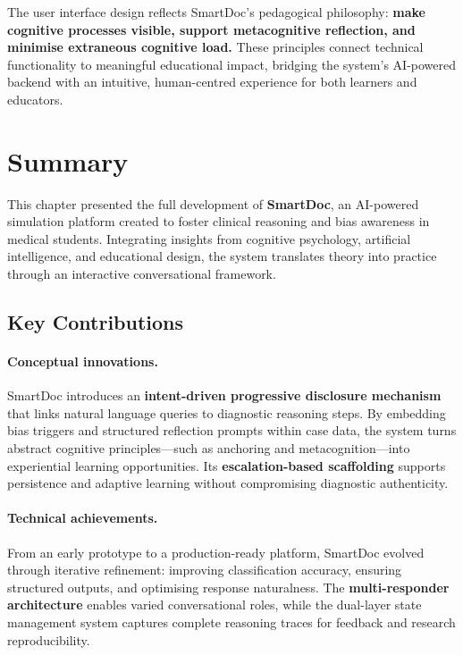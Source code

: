 \medskip
The user interface design reflects SmartDoc's pedagogical philosophy:
\textbf{make cognitive processes visible, support metacognitive reflection, and
minimise extraneous cognitive load.}
These principles connect technical functionality to meaningful educational impact,
bridging the system’s AI-powered backend with an intuitive, human-centred
experience for both learners and educators.

\newpage
\section{Summary}
\label{sec:summary}

This chapter presented the full development of \textbf{SmartDoc}, an AI-powered
simulation platform created to foster clinical reasoning and bias awareness in
medical students.
Integrating insights from cognitive psychology, artificial intelligence, and
educational design, the system translates theory into practice through an
interactive conversational framework.

\subsection{Key Contributions}

\paragraph{Conceptual innovations.}
SmartDoc introduces an \textbf{intent-driven progressive disclosure mechanism}
that links natural language queries to diagnostic reasoning steps. By embedding
bias triggers and structured reflection prompts within case data, the system
turns abstract cognitive principles—such as anchoring and metacognition—into
experiential learning opportunities. Its \textbf{escalation-based scaffolding}
supports persistence and adaptive learning without compromising diagnostic
authenticity.

\paragraph{Technical achievements.}
From an early prototype to a production-ready platform, SmartDoc evolved through
iterative refinement: improving classification accuracy, ensuring structured
outputs, and optimising response naturalness.
The \textbf{multi-responder architecture} enables varied conversational roles,
while the dual-layer state management system captures complete reasoning traces
for feedback and research reproducibility.

